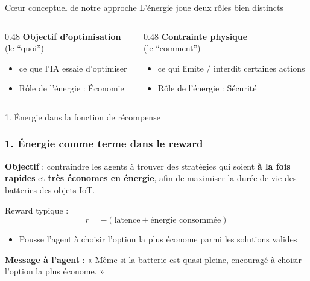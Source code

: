 \documentclass[10pt,aspectratio=169]{beamer}
\begin{document}
\begin{frame}{Cœur conceptuel de notre approche}
\centering
\Huge L'énergie joue deux rôles bien distincts

\bigskip

\begin{columns}[T]
\begin{column}{0.48\textwidth}
    \textbf{Objectif d’optimisation} 
    \vspace{0.2cm}
    \\ (le ``quoi'')
    \vspace{0.2cm}
    \normalsize
    \begin{itemize}
        \item ce que l’IA essaie d’optimiser
        \item Rôle de l’énergie : Économie
    \end{itemize}
\end{column}
\begin{column}{0.48\textwidth}
    \textbf{Contrainte physique} 
    \vspace{0.2cm}
    \\ (le ``comment'')
    \vspace{0.2cm}
    \normalsize
    \begin{itemize}
        \item ce qui limite / interdit certaines actions
        \item Rôle de l’énergie : Sécurité
    \end{itemize}
\end{column}
\end{columns}
\end{frame}

\begin{frame}{1. Énergie dans la fonction de récompense}
\frametitle{1. Énergie comme terme dans le reward}

\textbf{Objectif} : contraindre les agents à trouver des stratégies qui soient \textbf{à la fois rapides} et \textbf{très économes en énergie}, afin de maximiser la durée de vie des batteries des objets IoT.

Reward typique :
\[ r = -( \text{latence} + \text{énergie consommée}) \]

\begin{itemize}
    \item Pousse l’agent à choisir l’option \alert{la plus économe} parmi les solutions valides
\end{itemize}

\bigskip
\centering
\textbf{Message à l’agent} : « Même si la batterie est quasi-pleine, encouragé à choisir l'option la plus économe. »
\end{frame}
\end{document}
